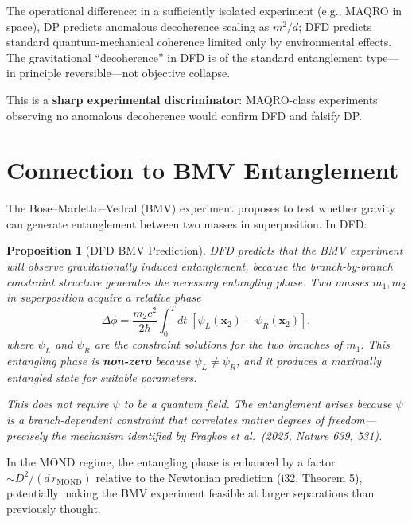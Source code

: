 \documentclass[11pt,a4paper]{article}
\newtheorem{proposition}[theorem]{Proposition}
\begin{document}
The operational difference: in a sufficiently isolated experiment
(e.g., MAQRO in space), DP predicts anomalous decoherence scaling as
$m^2/d$; DFD predicts standard quantum-mechanical coherence limited
only by environmental effects. The gravitational ``decoherence'' in DFD
is of the standard entanglement type---in principle reversible---not
objective collapse.

This is a \textbf{sharp experimental discriminator}: MAQRO-class
experiments observing no anomalous decoherence would confirm DFD and
falsify DP.

\section{Connection to BMV Entanglement}
\label{sec:BMV}

The Bose--Marletto--Vedral (BMV) experiment proposes to test whether
gravity can generate entanglement between two masses in superposition.
In DFD:

\begin{proposition}[DFD BMV Prediction]
\label{prop:BMV}
DFD predicts that the BMV experiment will observe gravitationally
induced entanglement, because the branch-by-branch constraint structure
generates the necessary entangling phase. Two masses $m_1, m_2$ in
superposition acquire a relative phase
\begin{equation}
\Delta\phi = \frac{m_2 c^2}{2\hbar}\int_0^T dt\;
[\psi_L(\mathbf{x}_2) - \psi_R(\mathbf{x}_2)],
\end{equation}
where $\psi_L$ and $\psi_R$ are the constraint solutions for the two
branches of $m_1$. This entangling phase is \textbf{non-zero} because
$\psi_L \neq \psi_R$, and it produces a maximally entangled state for
suitable parameters.

This does \emph{not} require $\psi$ to be a quantum field. The entanglement
arises because $\psi$ is a branch-dependent constraint that correlates
matter degrees of freedom---precisely the mechanism identified by
Fragkos et al.\ (2025, Nature 639, 531).
\end{proposition}

In the MOND regime, the entangling phase is enhanced by a factor
$\sim D^2/(d\,r_\mathrm{MOND})$ relative to the Newtonian prediction
(i32, Theorem 5), potentially making the BMV experiment feasible at
larger separations than previously thought.
\end{document}
